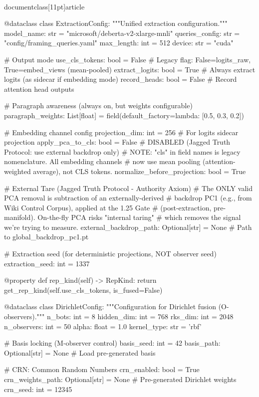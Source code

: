 \\documentclass[11pt]{article}
\begin{document}
\begin{CodeBlock}
@dataclass
class ExtractionConfig:
    """Unified extraction configuration."""
    model_name: str = "microsoft/deberta-v2-xlarge-mnli"
    queries_config: str = "config/framing_queries.yaml"
    max_length: int = 512
    device: str = "cuda"
    
    # Output mode
    use_cls_tokens: bool = False      # Legacy flag: False=logits_raw, True=embed_views (mean-pooled)
    extract_logits: bool = True       # Always extract logits (as sidecar if embedding mode)
    record_heads: bool = False        # Record attention head outputs

    # Paragraph awareness (always on, but weights configurable)
    paragraph_weights: List[float] = field(default_factory=lambda: [0.5, 0.3, 0.2])

    # Embedding channel config
    projection_dim: int = 256         # For logits sidecar projection
    apply_pca_to_cls: bool = False    # DISABLED (Jagged Truth Protocol: use external backdrop only)
    # NOTE: "cls" in field names is legacy nomenclature. All embedding channels
    # now use mean pooling (attention-weighted average), not CLS tokens.
    normalize_before_projection: bool = True

    # External Tare (Jagged Truth Protocol - Authority Axiom)
    # The ONLY valid PCA removal is subtraction of an externally-derived
    # backdrop PC1 (e.g., from Wiki Control Corpus), applied at the 1.25 Gate
    # (post-extraction, pre-manifold). On-the-fly PCA risks "internal taring"
    # which removes the signal we're trying to measure.
    external_backdrop_path: Optional[str] = None  # Path to global_backdrop_pc1.pt
    
    # Extraction seed (for deterministic projections, NOT observer seed)
    extraction_seed: int = 1337
    
    @property
    def rep_kind(self) -> RepKind:
        return get_rep_kind(self.use_cls_tokens, is_fused=False)


@dataclass
class DirichletConfig:
    """Configuration for Dirichlet fusion (O-observers)."""
    n_bots: int = 8
    hidden_dim: int = 768
    rks_dim: int = 2048
    n_observers: int = 50
    alpha: float = 1.0
    kernel_type: str = 'rbf'
    
    # Basis locking (M-observer control)
    basis_seed: int = 42
    basis_path: Optional[str] = None  # Load pre-generated basis
    
    # CRN: Common Random Numbers
    crn_enabled: bool = True
    crn_weights_path: Optional[str] = None  # Pre-generated Dirichlet weights
    crn_seed: int = 12345
    

\end{CodeBlock}
\end{document}
